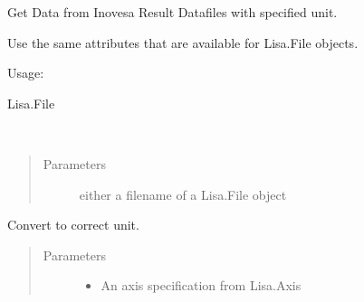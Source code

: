 \documentclass[letterpaper,10pt,openany,oneside,english]{sphinxmanual}
\begin{document}
\begin{fulllineitems}
\label{\detokenize{data:data.Data}}
Get Data from Inovesa Result Datafiles with specified unit.

Use the same attributes that are available for Lisa.File objects.

Usage:

\begin{sphinxVerbatim}[commandchars=\\\{\}]
    
   
   
\end{sphinxVerbatim}




Lisa.File



\begin{fulllineitems}
\label{\detokenize{data:data.Data.__init__}}~\begin{quote}\begin{description}
\item[{Parameters}] \leavevmode
{} \textendash{} either a filename of a Lisa.File object

\end{description}\end{quote}

\end{fulllineitems}


\begin{fulllineitems}
\label{\detokenize{data:data.Data.__getattr__}}
Convert to correct unit.
\begin{quote}\begin{description}
\item[{Parameters}] \leavevmode\begin{itemize}
\item {} 
 \textendash{} An axis specification from Lisa.Axis


\end{itemize}
\end{description}
\end{quote}
\end{fulllineitems}
\end{fulllineitems}
\end{document}
